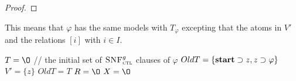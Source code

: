 \documentclass[letterpaper]{article} %
\begin{document}
\begin{proof}
%
%
%
%

\end{proof}

This means that $\varphi$ has the same models with $T_{\varphi}$ excepting that the atoms in $V'$ and the relations $[i]$ with $i\in I$.

\begin{algorithm}[!h]
\caption{$\emph{Transform}(\varphi)$}%
\label{alg:compute:transformation}
$T={\O}$ // the initial set of ${\textsc{SNF}_{\textsc{ctl}}^g}$ clauses of $\varphi$ \;
$OldT=\{\textbf{start} \supset z, z \supset \varphi\}$\;
$V'=\{z\}$\;
 {
    $OldT=T$\;
    $R={\O}$\;
    $X={\O}$\;
}

\end{algorithm}
\end{document}
